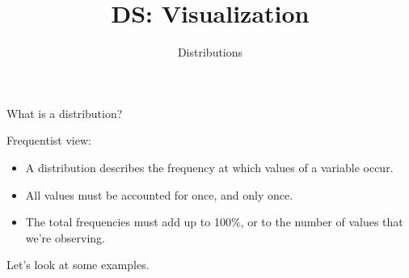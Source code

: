 \documentclass[aspectratio=169]{../latex_main/tntbeamer}  %
\title[Visualization]{DS: Visualization}
\subtitle{Distributions}
\begin{document}
	
	\maketitle
	\begin{frame}[c]{What is a distribution?}
	
	    Frequentist view:
	    \begin{itemize}
	        \item A distribution describes the frequency at which values of a variable occur.
	        \item All values must be accounted for once, and only once.
	        \item The total frequencies must add up to 100\%, or to the number of values that we’re observing.
	    \end{itemize}
	    \bigskip
	    Let’s look at some examples.
	\end{frame}
	
\end{document}
